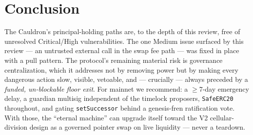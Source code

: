 \documentclass[11pt]{article}
\begin{document}
\section{Conclusion}

The Cauldron's principal-holding paths are, to the depth of this review, free of
unresolved Critical/High vulnerabilities. The one Medium issue surfaced by this
review — an untrusted external call in the swap fee path — was fixed in place with a pull
pattern. The protocol's remaining material risk is governance centralization, which it
addresses not by removing power but by making every dangerous action slow, visible,
vetoable, and — crucially — always preceded by a \emph{funded, un-blockable floor exit}.
For mainnet we recommend: a $\geq$7-day emergency delay, a guardian multisig independent of
the timelock proposers, \texttt{SafeERC20} throughout, and gating \texttt{setSuccessor}
behind a genesis-fren ratification vote. With those, the ``eternal machine'' can upgrade
itself toward the V2 cellular-division design as a governed pointer swap on live
liquidity — never a teardown.
\end{document}
